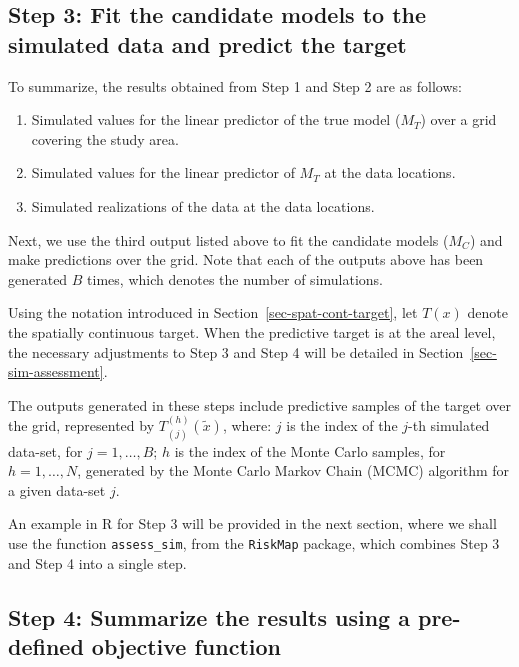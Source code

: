 \documentclass[
  letterpaper,
]{krantz}
\providecommand{\tightlist}{%
  \setlength{\itemsep}{0pt}\setlength{\parskip}{0pt}}
\begin{document}
\subsection{Step 3: Fit the candidate models to the simulated data and
predict the target}\label{sec-sim-step3}

To summarize, the results obtained from Step 1 and Step 2 are as
follows:

\begin{enumerate}
\def\labelenumi{\arabic{enumi}.}
\tightlist
\item
  Simulated values for the linear predictor of the true model (\(M_T\))
  over a grid covering the study area.
\item
  Simulated values for the linear predictor of \(M_T\) at the data
  locations.
\item
  Simulated realizations of the data at the data locations.
\end{enumerate}

Next, we use the third output listed above to fit the candidate models
(\(M_C\)) and make predictions over the grid. Note that each of the
outputs above has been generated \(B\) times, which denotes the number
of simulations.

Using the notation introduced in Section~\ref{sec-spat-cont-target}, let
\(T(x)\) denote the spatially continuous target. When the predictive
target is at the areal level, the necessary adjustments to Step 3 and
Step 4 will be detailed in Section~\ref{sec-sim-assessment}.

The outputs generated in these steps include predictive samples of the
target over the grid, represented by \(T_{(j)}^{(h)}(\tilde{x})\),
where: \(j\) is the index of the \(j\)-th simulated data-set, for
\(j = 1, \ldots, B\); \(h\) is the index of the Monte Carlo samples, for
\(h = 1, \ldots, N\), generated by the Monte Carlo Markov Chain (MCMC)
algorithm for a given data-set \(j\).

An example in R for Step 3 will be provided in the next section, where
we shall use the function \texttt{assess\_sim}, from the
\texttt{RiskMap} package, which combines Step 3 and Step 4 into a single
step.

\subsection{Step 4: Summarize the results using a pre-defined objective
function}\label{step-4-summarize-the-results-using-a-pre-defined-objective-function}
\end{document}
